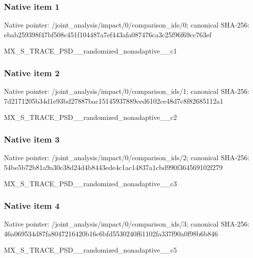 \documentclass[10pt,a4paper]{article}
\begin{document}
\subsubsection{Native item 1}
Native pointer: /joint\_\allowbreak{}analysis/impact/0/comparison\_\allowbreak{}ids/0; canonical SHA-256: ebab259398f47bf508c451f104487a7ef443afa087476ca3c25f96f69cc763ef

\begingroup\raggedright\sloppy MX\_\allowbreak{}S\_\allowbreak{}TRACE\_\allowbreak{}PSD\_\allowbreak{}\_\allowbreak{}randomized\_\allowbreak{}nonadaptive\_\allowbreak{}\_\allowbreak{}c1\par\endgroup

\subsubsection{Native item 2}
Native pointer: /joint\_\allowbreak{}analysis/impact/0/comparison\_\allowbreak{}ids/1; canonical SHA-256: 7d2171205b34d1e93bd27887bac15145937889ced6102ce48d7c8f82685112a1

\begingroup\raggedright\sloppy MX\_\allowbreak{}S\_\allowbreak{}TRACE\_\allowbreak{}PSD\_\allowbreak{}\_\allowbreak{}randomized\_\allowbreak{}nonadaptive\_\allowbreak{}\_\allowbreak{}c2\par\endgroup

\subsubsection{Native item 3}
Native pointer: /joint\_\allowbreak{}analysis/impact/0/comparison\_\allowbreak{}ids/2; canonical SHA-256: 54be5b72b81a9a30c38d24d4b8443ede4c1ac14837a1cbd990f364569102f279

\begingroup\raggedright\sloppy MX\_\allowbreak{}S\_\allowbreak{}TRACE\_\allowbreak{}PSD\_\allowbreak{}\_\allowbreak{}randomized\_\allowbreak{}nonadaptive\_\allowbreak{}\_\allowbreak{}c3\par\endgroup

\subsubsection{Native item 4}
Native pointer: /joint\_\allowbreak{}analysis/impact/0/comparison\_\allowbreak{}ids/3; canonical SHA-256: 46a069534d87fa8047216420b16c6bfd5530240f61102fa337f90a0f98b6b846

\begingroup\raggedright\sloppy MX\_\allowbreak{}S\_\allowbreak{}TRACE\_\allowbreak{}PSD\_\allowbreak{}\_\allowbreak{}randomized\_\allowbreak{}nonadaptive\_\allowbreak{}\_\allowbreak{}c5\par\endgroup
\end{document}
